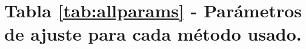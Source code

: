 
\section{Tabla \ref{tab:allparams} - Parámetros de ajuste para cada método usado.}
\pagebreak
% 


